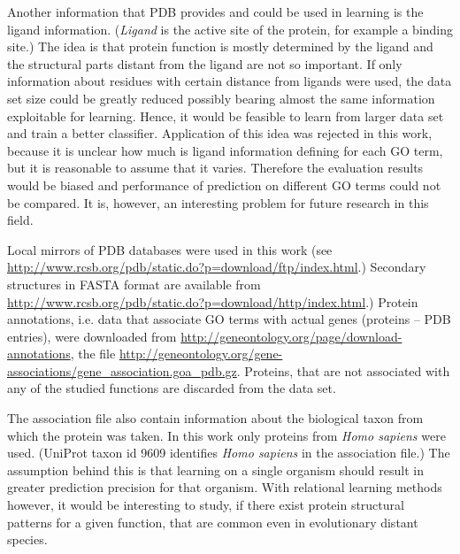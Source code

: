 \documentclass[11pt,twoside,a4paper]{book}
\begin{document}
Another information that PDB provides and could be used in learning is the ligand information.
(\emph{Ligand} is the active site of the protein, for example a binding site.) 
The idea is that protein function is mostly determined by the ligand and the structural parts 
distant from the ligand are not so important.
If only information about residues with certain distance from ligands were used,
the data set size could be greatly reduced possibly bearing almost the same information
exploitable for learning.
Hence, it would be feasible to learn from larger data set and train a better classifier.
Application of this idea was rejected in this work,
because it is unclear how much is ligand information defining for each GO term,
but it is reasonable to assume that it varies. 
Therefore the evaluation results would be biased and performance of prediction
on different GO terms could not be compared.
It is, however, an interesting problem for future research in this field.

Local mirrors of PDB databases were used in this work (see \url{http://www.rcsb.org/pdb/static.do?p=download/ftp/index.html}.)
Secondary structures in FASTA format are available from \url{http://www.rcsb.org/pdb/static.do?p=download/http/index.html}.)
Protein annotations, i.e. data that associate GO terms with actual genes (proteins -- PDB entries), were downloaded from
\url{http://geneontology.org/page/download-annotations}, 
the file \url{http://geneontology.org/gene-associations/gene_association.goa_pdb.gz}.
Proteins, that are not associated with any of the studied functions are discarded from the data set.

The association file also contain information about the biological taxon from which the protein was taken.
In this work only proteins from \emph{Homo sapiens} were used.
(UniProt taxon id 9609 identifies \emph{Homo sapiens} in the association file.) 
The assumption behind this is that learning on a single organism should result in
greater prediction precision for that organism.
With relational learning methods however, it would be interesting to study, if there exist protein
structural patterns for a given function, that are common even in evolutionary distant species.
\end{document}
